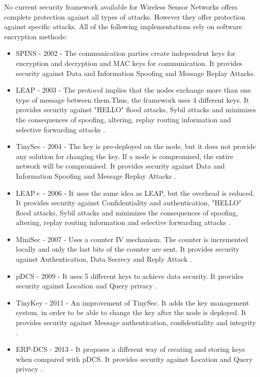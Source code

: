 No current security framework available for Wireless Sensor Networks offers complete protection
against all types of attacks. However they offer protection against specific attacks. All of the following implementations rely on 
software encryption methods:
\begin{itemize}

\item SPINS - 2002 - The communication parties create independent keys for encryption and decryption
and MAC keys for communication. It provides security against Data and Information Spoofing and Message Replay Attacks\cite{perrig2002spins}.

\item LEAP - 2003 - The protocol implies that the nodes exchange more than one type of message between them.Thus, the framework uses 4 different keys. It provides security against "HELLO" flood attacks, Sybil attacks and minimizes the consequences of spoofing, altering, replay routing information and selective forwarding attacks \cite{zhu2006leap+}.

\item TinySec - 2004 - The key is pre-deployed on the node, but it does not provide any solution for changing the key. If a node is compromised, the entire network will be compromised. It provides security against Data and Information Spoofing and Message Replay Attacks \cite{karlof2004tinysec}.

\item LEAP+ - 2006 - It uses the same idea as LEAP, but the overhead is reduced. It provides security against Confidentiality and authentication, "HELLO" flood attacks, Sybil attacks and minimizes the consequences of spoofing, altering, replay routing information and selective forwarding attacks \cite{zhu2006leap+}.
 
\item MiniSec - 2007 - Uses a counter IV mechanism. The counter is incremented locally and only the last bits of the counter are sent. It provides security against Authentication, Data Secrecy and Reply Attack \cite{luk2007minisec}.

\item pDCS - 2009 - It uses 5 different keys to achieve data security. It provides security against Location and Query privacy \cite{shao2009pdcs}.

\item TinyKey - 2011 - An improvement of TinySec. It adds the key management system, in order to be able to change the key after the node is deployed. It provides security against Message authentication, confidentiality and integrity \cite{doriguzzi2011tinykey}.

\item ERP-DCS - 2013 - It proposes a different way of creating and storing keys when compared with pDCS. It provides security against Location and Query privacy \cite{huang2013efficient}.

\end{itemize}

